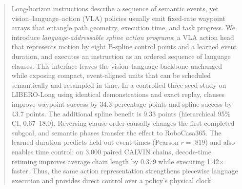 \begin{abstract}
Long-horizon instructions describe a sequence of semantic events, yet vision--language--action (VLA) policies usually emit fixed-rate waypoint arrays that entangle path geometry, execution time, and task progress. We introduce \emph{language-addressable spline action programs}: a VLA action head that represents motion by eight B-spline control points and a learned event duration, and executes an instruction as an ordered sequence of language clauses. This interface leaves the vision--language backbone unchanged while exposing compact, event-aligned units that can be scheduled semantically and resampled in time. In a controlled three-seed study on LIBERO-Long using identical demonstrations and exact replay, clauses improve waypoint success by 34.3 percentage points and spline success by 43.7 points. The additional spline benefit is 9.33 points (hierarchical 95\% CI, 0.67--18.0). Reversing clause order causally changes the first completed subgoal, and semantic phases transfer the effect to RoboCasa365. The learned duration predicts held-out event times (Pearson $r=.819$) and also enables time control: on 3,000 paired CALVIN chains, decode-time retiming improves average chain length by 0.379 while executing 1.42$\times$ faster. Thus, the same action representation strengthens piecewise language execution and provides direct control over a policy's physical clock.
\end{abstract}
